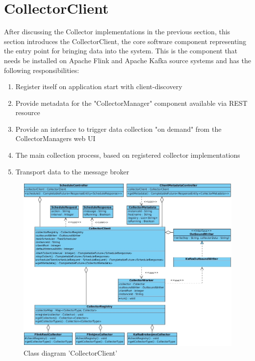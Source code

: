 \section{CollectorClient}

After discussing the Collector implementations in the previous section, this section introduces the CollectorClient,
the core software component representing the entry point for bringing data into the system. This is the component that needs be
installed on Apache Flink and Apache Kafka source systems and has the following responsibilities:

\begin{enumerate}
    \item Register itself on application start with client-discovery
    \item Provide metadata for the "CollectorManager" component available via REST resource
    \item Provide an interface to trigger data collection "on demand" from the CollectorManagers web UI
    \item The main collection process, based on registered collector implementations
    \item Transport data to the message broker
\end{enumerate}

\begin{figure}[H]
	\centering
	\includegraphics[width=1.0\textwidth]{../uml/class-collector-client.jpg}
	\caption{Class diagram 'CollectorClient'}
	\label{class-diagram-collector-client}
\end{figure}

